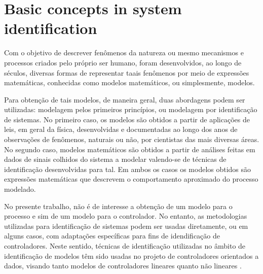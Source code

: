 
\chapter{Basic concepts in system identification}
\label{cap:cap2} \vspace{-1cm}

%
Com o objetivo de descrever fenômenos da natureza ou mesmo mecanismos e processos criados pelo próprio ser humano, foram desenvolvidos, ao longo de séculos, diversas formas de representar taais fenômenos por meio de expressões matemáticas, conhecidas como modelos matemáticos, ou simplesmente, modelos.

Para obtenção de tais modelos, de maneira geral, duas abordagens podem ser utilizadas: modelagem pelos primeiros princípios, ou modelagem por identificação de sistemas. No primeiro caso, os modelos são obtidos a partir de aplicações de leis, em geral da física, desenvolvidas e documentadas ao longo dos anos de observações de fenômenos, naturais ou não, por cientistas das mais diversas áreas. No segundo caso, modelos matemáticos são obtidos a partir de análises feitas em dados de sinais colhidos do sistema a modelar valendo-se de técnicas de identificação desenvolvidas para tal. Em ambos os casos os modelos obtidos são expressões matemáticas que descrevem o comportamento aproximado do processo modelado.

No presente trabalho, não é de interesse a obtenção de um modelo para o processo e sim de um modelo para o controlador. No entanto, as metodologias utilizadas  para identificação de sistemas podem ser usadas diretamente, ou  em alguns casos, com adaptações específicas para fins de idendificação de controladores. Neste sentido, técnicas de identificação utilizadas no âmbito de identificação de modelos têm sido usadas no projeto de controladores orientados a dados, visando tanto modelos de controladores lineares \citep{campi2002} quanto não lineares \citep{campi2006}.

